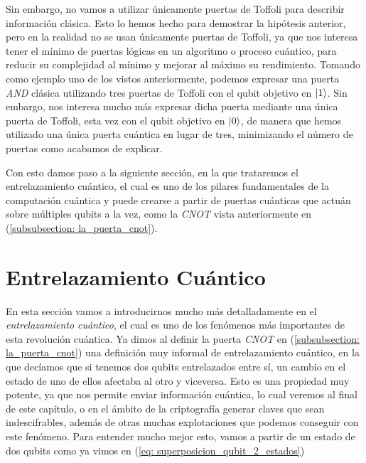 \documentclass{article}
\numberwithin{equation}{section} %
\begin{document}
    \vspace{5mm}

    Sin embargo, no vamos a utilizar únicamente puertas de Toffoli para describir información clásica. Esto lo hemos hecho para demostrar la hipótesis anterior, pero en la realidad no se usan únicamente puertas de Toffoli, ya que nos interesa tener el mínimo de puertas lógicas en un algoritmo o proceso cuántico, para reducir su complejidad al mínimo y mejorar al máximo su rendimiento. Tomando como ejemplo uno de los vistos anteriormente, podemos expresar una puerta \textit{AND} clásica utilizando tres puertas de Toffoli con el qubit objetivo en \( \ket{1} \). Sin embargo, nos interesa mucho más expresar dicha puerta mediante una única puerta de Toffoli, esta vez con el qubit objetivo en \( \ket{0} \), de manera que hemos utilizado una única puerta cuántica en lugar de tres, minimizando el número de puertas como acabamos de explicar.

    \vspace{5mm}

    Con esto damos paso a la siguiente sección, en la que trataremos el entrelazamiento cuántico, el cual es uno de los pilares fundamentales de la computación cuántica y puede crearse a partir de puertas cuánticas que actuán sobre múltiples qubits a la vez, como la \textit{CNOT} vista anteriormente en (\ref{subsubsection: la_puerta_cnot}).

        
        
    
        






    \newpage
    \thispagestyle{empty}
    \mbox{}

    \section{Entrelazamiento Cuántico}\label{sec: entrelazamiento_cuantico}

    \vspace{5mm}
    En esta sección vamos a introducirnos mucho más detalladamente en el \textit{entrelazamiento cuántico}, el cual es uno de los fenómenos más importantes de esta revolución cuántica. Ya dimos al definir la puerta \textit{CNOT} en (\ref{subsubsection: la_puerta_cnot}) una definición muy informal de entrelazamiento cuántico, en la que decíamos que si tenemos dos qubits entrelazados entre sí, un cambio en el estado de uno de ellos afectaba al otro y viceversa. Esto es una propiedad muy potente, ya que nos permite enviar información cuántica, lo cual veremos al final de este capítulo, o en el ámbito de la criptografía generar claves que sean indescifrables, además de otras muchas explotaciones que podemos conseguir con este fenómeno. Para entender mucho mejor esto, vamos a partir de un estado de dos qubits como ya vimos en (\ref{eq: superposicion_qubit_2_estados})
\end{document}
